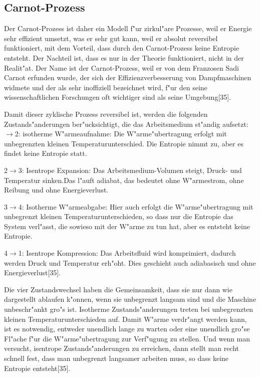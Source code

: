 \subsection{Carnot-Prozess}

Der Carnot-Prozess ist daher ein Modell f"ur zirkul"are Prozesse, 
weil er Energie sehr effizient umsetzt, was er sehr gut kann, 
weil er absolut reversibel funktioniert, mit dem Vorteil, 
dass durch den Carnot-Prozess keine Entropie entsteht. 
Der Nachteil ist, dass es nur in der Theorie funktioniert, 
nicht in der Realit"at. Der Name ist der Carnot-Prozess, 
weil er von dem Franzosen Sadi Carnot erfunden wurde, 
der sich der Effizienzverbesserung von Dampfmaschinen widmete 
und der als sehr inoffiziell bezeichnet wird, 
f"ur den seine wissenschaftlichen Forschungen oft 
wichtiger sind als seine Umgebung[35]. 

Damit dieser zyklische Prozess reversibel ist, 
werden die folgenden Zustands"anderungen ber"ucksichtigt, 
die das Arbeitsmedium st"andig aufsetzt:  $\rightarrow$2:  isotherme W"armeaufnahme: Die W"arme"ubertragung erfolgt 
mit unbegrenzten kleinen Temperaturunterschied. 
Die Entropie nimmt zu, aber es findet keine Entropie statt.\newline

2$\rightarrow$3:   Isentrope Expansion: Das Arbeitsmedium-Volumen steigt,
 Druck- und Temperatur sinken.Das l"auft adiabat, das bedeutet ohne W"armestrom,
  ohne Reibung und ohne Energieverlust. \newline
  
3$\rightarrow$4: Isotherme W"armeabgabe: Hier auch erfolgt die W"arme"ubertragung
 mit unbegrenzt kleinen Temperaturunterschieden, so dass nur die Entropie 
 das System verl"asst, die sowieso mit der W"arme zu tun hat, 
 aber es entsteht keine Entropie. \newline
 
4$\rightarrow$1: Isentrope Kompression: Das Arbeitsfluid wird komprimiert,
 dadurch werden Druck und Temperatur erh"oht. 
 Dies geschieht auch adiabasisch und ohne Energieverlust[35]. \newline
 
 Die vier Zustandswechsel haben die Gemeinsamkeit, 
 dass sie nur dann wie dargestellt ablaufen k"onnen, 
 wenn sie unbegrenzt langsam sind und die Maschine unbeschr"ankt gro"s ist. 
 Isotherme Zustands"anderungen treten bei unbegrenzten kleinen 
 Temperaturunterschieden  auf. Damit W"arme verdr"angt werden kann, 
 ist es notwendig, entweder unendlich lange zu warten oder 
 eine unendlich gro"se Fl"ache f"ur die W"arme"ubertragung zur Verf"ugung zu 
 stellen. Und wenn man versucht, isentrope Zustands"anderungen zu 
 erreichen, dann stellt man recht schnell fest, dass man unbegrenzt 
 langsamer arbeiten muss, so dass keine Entropie entsteht[35]. 


